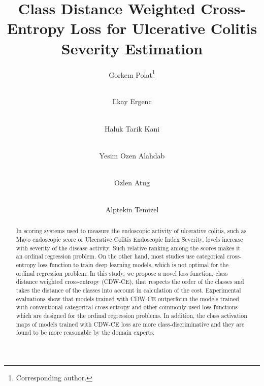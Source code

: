 \documentclass[runningheads]{llncs}
\begin{document}
\title{Class Distance Weighted Cross-Entropy Loss for Ulcerative Colitis Severity Estimation}



\author{Gorkem Polat\thanks{Corresponding author.}  \and \\
Ilkay Ergenc \and \\
Haluk Tarik Kani \and \\
Yesim Ozen Alahdab \and \\
Ozlen Atug \and \\
Alptekin Temizel}





\maketitle    \begin{abstract}

In scoring systems used to measure the endoscopic activity of ulcerative colitis, such as Mayo endoscopic score or Ulcerative Colitis Endoscopic Index Severity, levels increase with severity of the disease activity. Such relative ranking among the scores makes it an ordinal regression problem. On the other hand, most studies use categorical cross-entropy loss function to train deep learning models, which is not optimal for the ordinal regression problem. In this study, we propose a novel loss function, class distance weighted cross-entropy (CDW-CE), that respects the order of the classes and takes the distance of the classes into account in calculation of the cost. Experimental evaluations show that models trained with CDW-CE outperform the models trained with conventional categorical cross-entropy and other commonly used loss functions which are designed for the ordinal regression problems. In addition, the class activation maps of models trained with CDW-CE loss are more class-discriminative and they are found to be more reasonable by the domain experts. 


\end{abstract}
\end{document}
